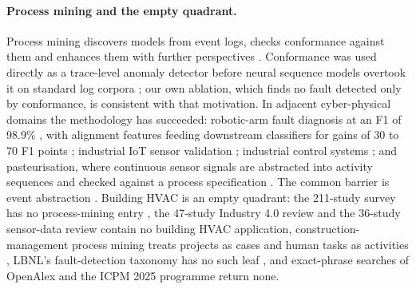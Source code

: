 \documentclass[11pt,letterpaper]{article}
\begin{document}
\paragraph{Process mining and the empty quadrant.} Process mining discovers models from event logs, checks conformance against them and enhances them with further perspectives \cite{vanderaalst2012manifesto,vanderaalst2016processmining}. Conformance was used directly as a trace-level anomaly detector \cite{bezerra2013anomalytraces} before neural sequence models overtook it on standard log corpora \cite{nolle2022binet}; our own ablation, which finds no fault detected only by conformance, is consistent with that motivation. In adjacent cyber-physical domains the methodology has succeeded: robotic-arm fault diagnosis at an F1 of 98.9\% \cite{vitale2025roadcps}, with alignment features feeding downstream classifiers for gains of 30 to 70 F1 points \cite{vitale2025kbsfeatures}; industrial IoT sensor validation \cite{husom2026udava}; industrial control systems \cite{myers2018pmics,singh2022pmselfhealing}; and pasteurisation, where continuous sensor signals are abstracted into activity sequences and checked against a process specification \cite{moradbeikie2025pasteurization}. The common barrier is event abstraction \cite{mangler2024iotbp,brzychczy2025iotminer}. Building HVAC is an empty quadrant: the 211-study survey has no process-mining entry \cite{bi2024aihvacreview}, the 47-study Industry 4.0 review \cite{akhramovich2024pmindustry40} and the 36-study sensor-data review \cite{brzychczy2025pmsensorreview} contain no building HVAC application, construction-management process mining treats projects as cases and human tasks as activities \cite{martinezlagunas2024constructionpm}, LBNL's fault-detection taxonomy has no such leaf \cite{granderson2017fddtoolsurvey}, and exact-phrase searches of OpenAlex \cite{priem2022openalex} and the ICPM 2025 programme return none.
\end{document}
